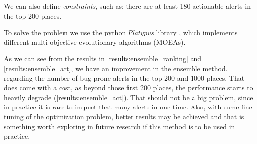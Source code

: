 We can also define \textit{constraints}, such as: there are at least 180 actionable alerts in the top 200 places.

To solve the problem we use the python \textit{Platypus} library \cite{platypus}, which implements different multi-objective evolutionary algorithms (MOEAs). 

As we can see from the results in \cref{results:ensemble_ranking} and \cref{results:ensemble_act}, we have an improvement in the ensemble method, regarding the number of bug-prone alerts in the top 200 and 1000 places. That does come with a cost, as beyond those first 200 places, the performance starts to heavily degrade (\cref{results:ensemble_act}). That should not be a big problem, since in practice it is rare to inspect that many alerts in one time. Also, with some fine tuning of the optimization problem, better results may be achieved and that is something worth exploring in future research if this method is to be used in practice. 


